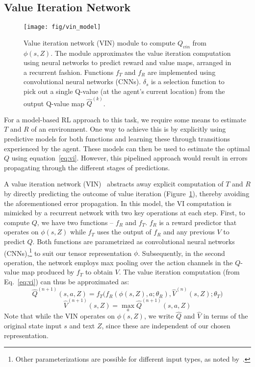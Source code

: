 \color{black}
\subsection{Value Iteration Network}

\begin{figure}[!t]
\centering
  \texttt{[image: fig/vin\_model]}
\caption{Value iteration network (VIN) module to compute $Q_{vin}$ from $\phi(s, Z)$. The module approximates the value iteration computation using neural networks to predict reward and value maps, arranged in a recurrent fashion. Functions $f_T$ and $f_R$ are implemented using convolutional neural networks (CNNs). $\delta_s$ is a selection function to pick out a single Q-value (at the agent's current location) from the output Q-value map $\hat{Q}^{(k)}$.}
	\label{fig:transfer-model}
\end{figure}

For a model-based RL approach to this task, we require some means to estimate $T$ and $R$ of an environment. One way to achieve this is by explicitly using predictive models for both functions and learning these through transitions experienced by the agent. These models can then be used to estimate the optimal $Q$ using equation~\ref{eq:vi}. However, this pipelined approach would result in  errors propagating through the different stages of predictions.
 
A value iteration network (VIN)~\cite{tamar2016value} abstracts away explicit computation of $T$ and $R$ by directly predicting the outcome of value iteration (Figure~\ref{fig:transfer-model}), thereby avoiding the aforementioned error propagation. In this model, the VI computation is mimicked by a recurrent network with two key operations at each step. First, to compute $Q$, we have two functions -- $f_R$ and $f_T$. $f_R$ is a reward predictor that operates on $\phi(s, Z)$ while $f_T$ uses the output of $f_R$ and any previous $V$ to predict $Q$. Both functions are parametrized as convolutional neural networks (CNNs),\footnote{Other parameterizations are possible for different input types, as noted by~.} to suit our tensor representation $\phi$. Subsequently, in the second operation, the network employs max pooling over the action channels in the $Q$-value map produced by $f_T$ to obtain $V$. 
The value iteration computation (from Eq.~\ref{eq:vi}) can thus be approximated as:
\begin{dmath}
\hat{Q}^{(n+1)}(s, a, Z) = f_T \Big(f_R(\phi(s,Z), a; \theta_R), \hat{V}^{(n)}(s, Z); \theta_T \Big) 
\end{dmath} \vspace{-0.1cm}
\begin{dmath}
\hat{V}^{(n+1)}(s, Z) = \max_a \hat{Q}^{(n+1)}(s,a, Z)
\end{dmath}
Note that while the VIN operates on $\phi(s,Z)$, we write $\hat{Q}$ and $\hat{V}$ in terms of the original state input $s$ and text $Z$, since these are independent of our chosen representation.

